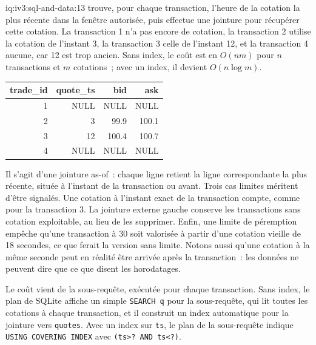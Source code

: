 \begin{solution}{iq:iv3:sql-and-data:13}
 trouve, pour chaque transaction, l'heure de la cotation la plus récente dans la fenêtre autorisée, puis effectue une jointure pour récupérer cette cotation. La transaction 1 n'a pas encore de cotation, la transaction 2 utilise la cotation de l'instant 3, la transaction 3 celle de l'instant 12, et la transaction 4 aucune, car 12 est trop ancien. Sans index, le coût est en $O(nm)$ pour $n$ transactions et $m$ cotations~; avec un index, il devient $O(n \log m)$.
\label{lst:iv3:sq:asofc}
\begin{center}\small
\begin{tabular}{rrrr}
trade\_id & quote\_ts & bid & ask\\\hline
1 & NULL & NULL & NULL\\
2 & 3 & 99.9 & 100.1\\
3 & 12 & 100.4 & 100.7\\
4 & NULL & NULL & NULL
\end{tabular}
\end{center}
Il s'agit d'une jointure as-of~: chaque ligne retient la ligne correspondante la plus récente, située à l'instant de la transaction ou avant. Trois cas limites méritent d'être signalés. Une cotation à l'instant exact de la transaction compte, comme pour la transaction 3. La jointure externe gauche conserve les transactions sans cotation exploitable, au lieu de les supprimer. Enfin, une limite de péremption empêche qu'une transaction à 30 soit valorisée à partir d'une cotation vieille de 18 secondes, ce que ferait la version sans limite. Notons aussi qu'une cotation à la même seconde peut en réalité être arrivée après la transaction~: les données ne peuvent dire que ce que disent les horodatages.

Le coût vient de la sous-requête, exécutée pour chaque transaction. Sans index, le plan de SQLite affiche un simple \texttt{SEARCH q} pour la sous-requête, qui lit toutes les cotations à chaque transaction, et il construit un index automatique pour la jointure vers \texttt{quotes}. Avec un index sur \texttt{ts}, le plan de la sous-requête indique \texttt{USING COVERING INDEX} avec \texttt{(ts>? AND ts<?)}.

\end{solution}

